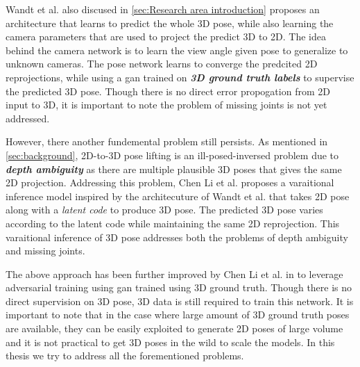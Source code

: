 Wandt et al. \cite{repnet} also discused in \ref{sec:Research area introduction} proposes an architecture that learns to predict the whole 3D pose, while also learning the camera parameters that are used to project the predict 3D to 2D. The idea behind the camera network is to learn the view angle given pose to generalize to unknown cameras. The pose network learns to converge the predcited 2D reprojections, while using a \ac{gan} trained on \textit{\textbf{3D ground truth labels}} to supervise the predicted 3D pose. Though there is no direct error propogation from 2D input to 3D, it is important to note the problem of missing joints is not yet addressed. 

However, there another fundemental problem still persists. As mentioned in \ref{sec:background}, 2D-to-3D pose lifting is an ill-posed-inversed problem due to \textit{\textbf{depth ambiguity}} as there are multiple plausible 3D poses that gives the same 2D projection. Addressing this problem, Chen Li et al. \cite{multiplehypo} proposes a varaitional inference model inspired by the architecuture of Wandt et al. \cite{repnet} that takes 2D pose along with a \textit{latent code} to produce 3D pose. The predicted 3D pose varies according to the latent code while maintaining the same 2D reprojection. This varaitional inference of 3D pose addresses both the problems of depth ambiguity and missing joints. 

The above approach has been further improved by Chen Li et al. in \cite{weaklymultiple} to leverage adversarial training using \ac{gan} trained using 3D ground truth. Though there is no direct supervision on 3D pose, 3D data is still required to train this network. It is important to note that in the case where large amount of 3D ground truth poses are available, they can be easily exploited to generate 2D poses of large volume and it is not practical to get 3D poses in the wild to scale the models. In this thesis we try to address all the forementioned problems.

